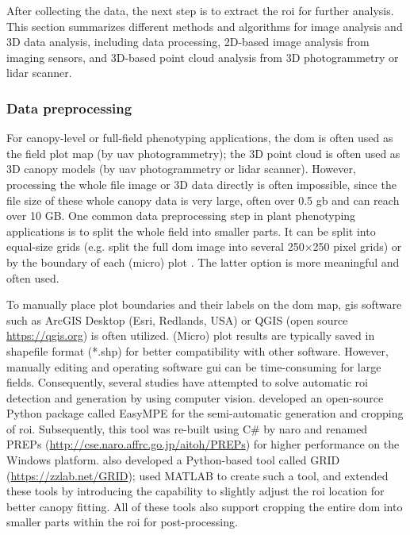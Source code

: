 After collecting the data, the next step is to extract the \acrfull{roi} for further analysis. This section summarizes different methods and algorithms for image analysis and 3D data analysis, including data processing, 2D-based image analysis from imaging sensors, and 3D-based point cloud analysis from 3D photogrammetry or \gls{lidar} scanner.

\subsubsection{Data preprocessing} \label{sec:prepro}

For canopy-level or full-field phenotyping applications, the \acrfull{dom} is often used as the field plot map (by \gls{uav} photogrammetry); the 3D point cloud is often used as 3D canopy models (by \gls{uav} photogrammetry or \gls{lidar} scanner). However, processing the whole file image or 3D data directly is often impossible, since the file size of these whole canopy data is very large, often over 0.5 \gls{gb} and can reach over 10 GB. One common data preprocessing step in plant phenotyping applications is to split the whole field into smaller parts. It can be split into equal-size grids (e.g. \citet{bauer_combining_2019} split the full \gls{dom} image into several 250$\times$250 pixel grids) or by the boundary of each (micro) plot \citep{tresch_easympe_2019}. The latter option is more meaningful and often used.

To manually place plot boundaries and their labels on the \gls{dom} map, \gls{gis} software such as ArcGIS Desktop (Esri, Redlands, USA) or QGIS (open source \url{https://qgis.org}) is often utilized. (Micro) plot results are typically saved in shapefile format (*.shp) for better compatibility with other software. However, manually editing and operating software \gls{gui} can be time-consuming for large fields. Consequently, several studies have attempted to solve automatic \gls{roi} detection and generation by using computer vision. \citet{tresch_easympe_2019} developed an open-source Python package called EasyMPE for the semi-automatic generation and cropping of \gls{roi}. Subsequently, this tool was re-built using C\# by \gls{naro} and renamed PREPs (\url{http://cse.naro.affrc.go.jp/aitoh/PREPs}) for higher performance on the Windows platform. \citet{chen_grid_2020} also developed a Python-based tool called GRID (\url{https://zzlab.net/GRID}); \citet{mortensen_drone_2019} used MATLAB to create such a tool, and \citet{sara_automatic_2021} extended these tools by introducing the capability to slightly adjust the \gls{roi} location for better canopy fitting. All of these tools also support cropping the entire \gls{dom} into smaller parts within the \gls{roi} for post-processing.

